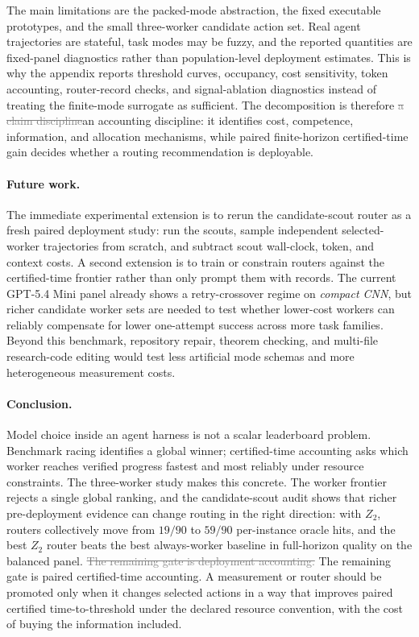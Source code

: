 \documentclass{article}
\newcommand{\oldtext}[1]{\textcolor{gray}{\sout{#1}}}
\newcommand{\newtext}[1]{\textcolor{green!50!black}{#1}}
\begin{document}
The main limitations are the packed-mode abstraction, the fixed executable prototypes, and the small three-worker candidate action set.
Real agent trajectories are stateful, task modes may be fuzzy, and the reported quantities are fixed-panel diagnostics rather than population-level deployment estimates.
This is why the appendix reports threshold curves, occupancy, cost sensitivity, token accounting, router-record checks, and signal-ablation diagnostics instead of treating the finite-mode surrogate as sufficient.
The decomposition is therefore \oldtext{a claim discipline}\newtext{an accounting discipline}: it identifies cost, competence, information, and allocation mechanisms, while paired finite-horizon certified-time gain decides whether a routing recommendation is deployable.

\paragraph{Future work.}
The immediate experimental extension is to rerun the candidate-scout router as a fresh paired deployment study: run the scouts, sample independent selected-worker trajectories from scratch, and subtract scout wall-clock, token, and context costs.
A second extension is to train or constrain routers against the certified-time frontier rather than only prompt them with records.
The current GPT-5.4 Mini panel already shows a retry-crossover regime on \textit{compact CNN}, but richer candidate worker sets are needed to test whether lower-cost workers can reliably compensate for lower one-attempt success across more task families.
Beyond this benchmark, repository repair, theorem checking, and multi-file research-code editing would test less artificial mode schemas and more heterogeneous measurement costs.

\paragraph{Conclusion.}
Model choice inside an agent harness is not a scalar leaderboard problem.
Benchmark racing identifies a global winner; certified-time accounting asks which worker reaches verified progress fastest and most reliably under resource constraints.
The three-worker study makes this concrete.
The worker frontier rejects a single global ranking, and the candidate-scout audit shows that richer pre-deployment evidence can change routing in the right direction: with \(Z_2\), routers collectively move from \(19/90\) to \(59/90\) per-instance oracle hits, and the best \(Z_2\) router beats the best always-worker baseline in full-horizon quality on the balanced panel.
\oldtext{The remaining gate is deployment accounting.}
\newtext{The remaining gate is paired certified-time accounting.}
A measurement or router should be promoted only when it changes selected actions in a way that improves paired certified time-to-threshold under the declared resource convention, with the cost of buying the information included.
\end{document}
